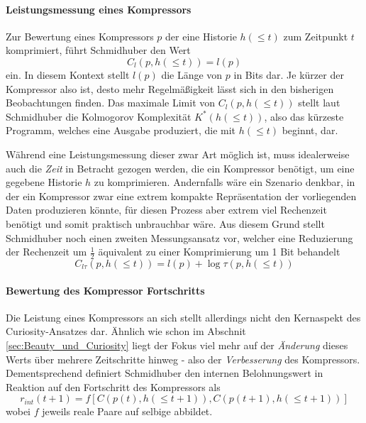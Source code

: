 \paragraph{Leistungsmessung eines Kompressors}
Zur Bewertung eines Kompressors \(p\) der eine Historie \(h(\leq t)\) zum Zeitpunkt \(t\) komprimiert, führt Schmidhuber den Wert 
\begin{equation}
  C_l(p,h(\leq t)) = l(p)  
\end{equation}
ein. In diesem Kontext stellt \(l(p)\) die Länge von \(p\) in Bits dar. Je kürzer der Kompressor also ist, desto mehr Regelmäßigkeit lässt sich in den bisherigen Beobachtungen finden. \cite[p.~19]{curiosity_schmidhuber}
Das maximale Limit von \(C_l(p,h(\leq t))\) stellt laut Schmidhuber die Kolmogorov Komplexität \(K^*(h(\leq t))\), also das kürzeste Programm, welches eine Ausgabe produziert, die mit \(h(\leq t)\) beginnt, dar.

Während eine Leistungsmessung dieser zwar Art möglich ist, muss idealerweise auch die \emph{Zeit} in Betracht gezogen werden, die ein Kompressor benötigt, um eine gegebene Historie \(h\) zu komprimieren. Andernfalls wäre ein Szenario denkbar, in der ein Kompressor zwar eine extrem kompakte Repräsentation der vorliegenden Daten produzieren könnte, für diesen Prozess aber extrem viel Rechenzeit benötigt und somit praktisch unbrauchbar wäre.
Aus diesem Grund stellt Schmidhuber noch einen zweiten Messungsansatz vor, welcher eine Reduzierung der Rechenzeit um \(\frac{1}{2}\) äquivalent zu einer Komprimierung um 1 Bit behandelt \cite[p.~19]{curiosity_schmidhuber}
\begin{equation}
  C_{l\tau}(p,h(\leq t)) = l(p) + \log \tau(p, h(\leq t))
\end{equation}


\paragraph{Bewertung des Kompressor Fortschritts}
Die Leistung eines Kompressors an sich stellt allerdings nicht den Kernaspekt des Curiosity-Ansatzes dar. Ähnlich wie schon im Abschnit \ref{sec:Beauty_und_Curiosity} liegt der Fokus viel mehr auf der \emph{Änderung} dieses Werts über mehrere Zeitschritte hinweg - also der \emph{Verbesserung} des Kompressors.
Dementsprechend definiert Schmidhuber den internen Belohnungswert in Reaktion auf den Fortschritt des Kompressors als 
\begin{equation}
  r_{int}(t+1) = f\left[C(p(t),h(\leq t+1)), C(p(t+1),h(\leq t+1))\right]  
\end{equation}
wobei \(f\) jeweils reale Paare auf selbige abbildet. \cite[p.~19]{curiosity_schmidhuber}



